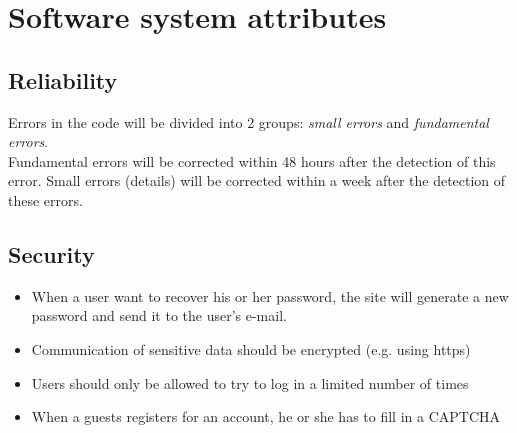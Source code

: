 \section{Software system attributes}
	\subsection{Reliability}
		Errors in the code will be divided into 2 groups: \textit{small errors} and \textit{fundamental errors}. \\ 
		Fundamental errors will be corrected within 48 hours after the detection of this error. Small errors (details) will be corrected within a week after the detection of these errors. 
	\subsection{Security}
		\begin{itemize}
			\item When a user want to recover his or her password, the site will generate a new password and send it to the user's e-mail.
			\item Communication of sensitive data should be encrypted (e.g. using https)
			\item Users should only be allowed to try to log in a limited number of times
			\item When a guests registers for an account, he or she has to fill in a CAPTCHA
		\end{itemize}
